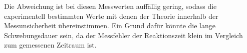 Die Abweichung ist bei diesen Messwerten auffällig gering, sodass die experimentell bestimmten Werte mit denen der Theorie innerhalb der Messunsicherheit übereinstimmen. 
Ein Grund dafür könnte die lange Schwebungsdauer sein, da der Messfehler der Reaktionszeit klein im Vergleich zum gemessenen Zeitraum ist.  
%
%



